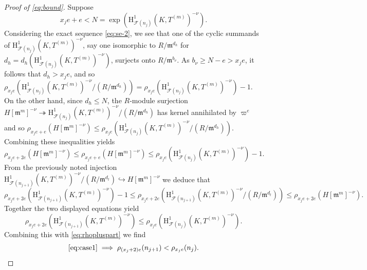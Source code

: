 \documentclass[a4paper,10pt]{amsart}
\numberwithin{equation}{section}
\numberwithin{equation}{section}
\theoremstyle{plain}
\theoremstyle{definition}
\theoremstyle{definition}
\theoremstyle{plain}
\theoremstyle{plain}
\theoremstyle{plain}
\theoremstyle{plain}
\newcommand{\F}{\mathcal{F}}
\newcommand{\cF}{\mathcal{F}}
\newcommand{\fm}{\mathfrak{m}}
\newcommand{\rH}{\mathrm{H}}
\begin{document}
\begin{proof}[Proof of \eqref{eq:bound}]
Suppose 
\begin{equation}\label{eq:case1} 
\tag{$\spadesuit$}
x_j e +e < N = \operatorname{exp} (\rH^1_{\F(n_j)}(K,T^{(m)})^{-\nu}).
\end{equation}
Considering the exact sequence \eqref{eq:se-2}, we see that one of the cyclic summands of $\rH^1_{\F(n_j)}(K,T^{(m)})^{-\nu}$, say one isomorphic
to $R/\fm^{d_h}$ for $d_h = d_h(\rH^1_{\F(n_j)}(K,T^{(m)})^{-\nu})$, surjects onto $R/\fm^{b_{\nu}}$. As $b_{\nu}\geq N - e > x_je$, it follows that
$d_h> x_je$, and so $\rho_{x_je}(\rH^1_{\F(n_j)}(K,T^{(m)})^{-\nu}/(R/\fm^{d_h})) = \rho_{x_je}(\rH^1_{\F(n_j)}(K,T^{(m)})^{-\nu}) - 1$.
On the other hand, since $d_h \leq N$, the $R$-module surjection $H[\fm^m]^{-\nu}\twoheadrightarrow \rH^1_{\cF(n_{j})}(K,T^{(m)})^{-\nu}/(R/\fm^{d_h})$ 
has kernel annihilated by $\varpi^e$ and so $\rho_{x_je+e}(H[\fm^m]^{-\nu}) \leq \rho_{x_je}(\rH^1_{\F(n_j)}(K,T^{(m)})^{-\nu}/(R/\fm^{d_h}))$.
Combining these inequalities yields
$$
\rho_{x_je+2e}(H[\fm^m]^{-\nu})\leq \rho_{x_je+e}(H[\fm^m]^{-\nu}) \leq \rho_{x_je}(\rH^1_{\F(n_j)}(K,T^{(m)})^{-\nu}) - 1.
$$
From the previously noted injection $\rH^1_{\cF(n_{j+1})}(K,T^{(m)})^{-\nu}/(R/\fm^{d_t})\hookrightarrow H[\fm^m]^{-\nu}$ we deduce that
$$
\rho_{x_je+2e}(\rH^1_{\cF(n_{j+1})}(K,T^{(m)})^{-\nu}) - 1 \leq \rho_{x_je+2e}(\rH^1_{\cF(n_{j+1})}(K,T^{(m)})^{-\nu}/(R/\fm^{d_t})) \leq
\rho_{x_je+2e}(H[\fm^m]^{-\nu}).
$$
Together the two displayed equations yield
$$
\rho_{x_je+2e}(\rH^1_{\cF(n_{j+1})}(K,T^{(m)})^{-\nu})\leq \rho_{x_je}(\rH^1_{\F(n_j)}(K,T^{(m)})^{-\nu}).
$$
Combining this with \eqref{eq:rhopluspart} we find 
\begin{equation}\label{eq:rhocase1}
\text{\eqref{eq:case1}} \implies \rho_{(x_j+2)e}(n_{j+1}) < \rho_{x_je}(n_j).
\end{equation}




\end{proof}
\end{document}
